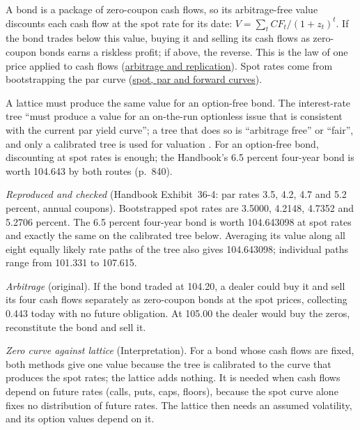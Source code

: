 \begin{qfmethod}\label{meth:arbitrage-free-bond-valuation}
 A bond is a package of zero-coupon cash flows, so its arbitrage-free value discounts each cash flow at the spot rate for its date: $V=\sum_tCF_t/(1+z_t)^t$. If the bond trades below this value, buying it and selling its cash flows as zero-coupon bonds earns a riskless profit; if above, the reverse. This is the law of one price applied to cash flows (\hyperref[meth:arbitrage-replication-carry]{arbitrage and replication}). Spot rates come from bootstrapping the par curve (\hyperref[meth:spot-par-forward-curves]{spot, par and forward curves}).

A lattice must produce the same value for an option-free bond. The interest-rate tree ``must produce a value for an on-the-run optionless issue that is consistent with the current par yield curve''; a tree that does so is ``arbitrage free'' or ``fair'', and only a calibrated tree is used for valuation \citep[chap.~36, pp.~831--832]{s7-fabozzifixed}. For an option-free bond, discounting at spot rates is enough; the Handbook's 6.5 percent four-year bond is worth 104.643 by both routes (p.~840).

 \emph{Reproduced and checked} (Handbook Exhibit~36-4: par rates 3.5, 4.2, 4.7 and 5.2 percent, annual coupons). Bootstrapped spot rates are 3.5000, 4.2148, 4.7352 and 5.2706 percent. The 6.5 percent four-year bond is worth 104.643098 at spot rates and exactly the same on the calibrated tree below. Averaging its value along all eight equally likely rate paths of the tree also gives 104.643098; individual paths range from 101.331 to 107.615.

\emph{Arbitrage} (original). If the bond traded at 104.20, a dealer could buy it and sell its four cash flows separately as zero-coupon bonds at the spot prices, collecting 0.443 today with no future obligation. At 105.00 the dealer would buy the zeros, reconstitute the bond and sell it.

\emph{Zero curve against lattice} (Interpretation). For a bond whose cash flows are fixed, both methods give one value because the tree is calibrated to the curve that produces the spot rates; the lattice adds nothing. It is needed when cash flows depend on future rates (calls, puts, caps, floors), because the spot curve alone fixes no distribution of future rates. The lattice then needs an assumed volatility, and its option values depend on it.


\end{qfmethod}

